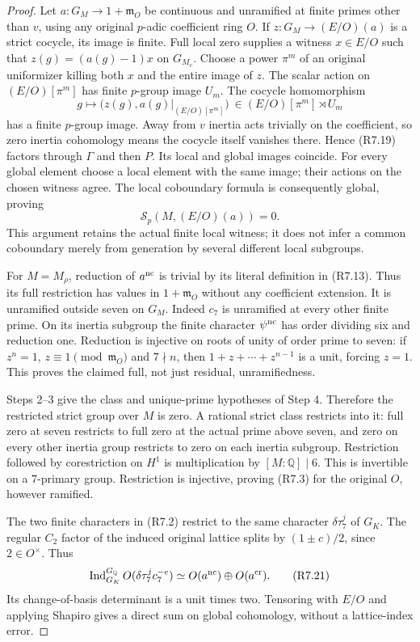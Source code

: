 \begin{proof}
Let $a:G_M\to1+\mathfrak m_O$ be continuous and unramified
at finite primes other than $v$, using any original $p$-adic
coefficient ring $O$. If $z:G_M\to(E/O)(a)$ is a strict cocycle,
its image is finite. Full local zero supplies a witness $x\in E/O$
such that $z(g)=(a(g)-1)x$ on $G_{M_v}$.
Choose a power $\pi^m$ of an original uniformizer killing
both $x$ and the entire image of $z$.
The scalar action on $(E/O)[\pi^m]$ has finite $p$-group image $U_m$.
The cocycle homomorphism
\[
 g\longmapsto\bigl(z(g),a(g)|_{(E/O)[\pi^m]}\bigr)
          \ \in (E/O)[\pi^m]\rtimes U_m
 \tag{R7.19}
\]
has a finite $p$-group image. Away from $v$ inertia acts trivially
on the coefficient, so zero inertia cohomology means the cocycle
itself vanishes there. Hence (R7.19) factors through $\Gamma$
and then $P$. Its local and global images coincide.
For every global element choose a local element with the same
image; their actions on the chosen witness agree.
The local coboundary formula is consequently global, proving
\[
                      \mathcal S_p(M,(E/O)(a))=0.
 \tag{R7.20}
\]
This argument retains the actual finite local witness; it does
not infer a common coboundary merely from generation by several
different local subgroups.

For $M=M_\rho$, reduction of $a^{\rm nc}$ is trivial by its
literal definition in (R7.13). Thus its full restriction has
values in $1+\mathfrak m_O$ without any coefficient extension.
It is unramified outside seven on $G_M$.
Indeed $c_7$ is unramified at every other finite prime.
On its inertia subgroup the finite character $\psi^{\rm nc}$
has order dividing six and reduction one.
Reduction is injective on roots of unity of order prime to seven:
if $z^n=1$, $z\equiv1\pmod{\mathfrak m_O}$ and $7\nmid n$,
then $1+z+\cdots+z^{n-1}$ is a unit, forcing $z=1$.
This proves the claimed full, not just residual, unramifiedness.

Steps 2--3 give the class and unique-prime hypotheses of Step 4.
Therefore the restricted strict group over $M$ is zero.
A rational strict class restricts into it: full zero at seven
restricts to full zero at the actual prime above seven, and
zero on every other inertia group restricts to zero on each
inertia subgroup. Restriction followed by corestriction on
$H^1$ is multiplication by $[M:\mathbb Q]\mid6$.
This is invertible on a $7$-primary group. Restriction is
injective, proving (R7.3) for the original $O$, however ramified.

The two finite characters in (R7.2) restrict to the same character
$\delta\tau_7^j$ of $G_K$.
The regular $C_2$ factor of the induced original lattice splits
by $(1\pm c)/2$, since $2\in O^\times$. Thus
\[
 \operatorname{Ind}_{G_K}^{G_{\mathbb Q}}
            O(\delta\tau_7^j c_7^{-e})
       \simeq O(a^{\rm nc})\oplus O(a^{\rm cr}).
 \tag{R7.21}
\]
Its change-of-basis determinant is a unit times two.
Tensoring with $E/O$ and applying Shapiro gives a direct sum
on global cohomology, without a lattice-index error.


\end{proof}
